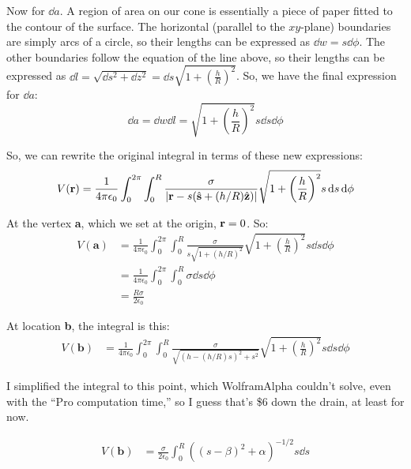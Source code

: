 \documentclass{article}
\begin{document}
Now for $\dd{a}$. A region of area on our cone is essentially a piece of paper fitted to the contour of the surface. The horizontal (parallel to the $xy$-plane) boundaries are simply arcs of a circle, so their lengths can be expressed as $\dd w = s\dd{\phi}$. The other boundaries follow the equation of the line above, so their lengths can be expressed as $\dd l = \sqrt{\dd{s}^2 + \dd{z}^2} = \dd{s}\sqrt{1 + \left(\frac{h}{R}\right)^2}$. So, we have the final expression for $\dd{a}$:
\begin{equation}
\dd{a} = \dd w \dd l = \sqrt{1 + \left(\frac{h}{R}\right)^2}s\dd{s}\dd{\phi}
\end{equation}

So, we can rewrite the original integral in terms of these new expressions:
\begin{equation}
V(\vb{r}) = \frac{1}{4\pi\epsilon_0}\int_0^{2\pi}\int_0^R \frac{\sigma}{|\vb{r} - s(\hat{\vb{s}} + (h/R)\hat{\vb{z}})|}\sqrt{1 + \left(\frac{h}{R}\right)^2}s\dd{s}\dd{\phi}
\end{equation}

At the vertex \textbf{a}, which we set at the origin, $\vb{r} = 0$. So:
\begin{equation}
\begin{aligned}
V(\textbf{a}) &= \frac{1}{4\pi\epsilon_0}\int_0^{2\pi}\int_0^R \frac{\sigma}{s\sqrt{1 + (h/R)^2}}\sqrt{1 + \left(\frac{h}{R}\right)^2}s\dd{s}\dd{\phi} \\
&= \frac{1}{4\pi\epsilon_0}\int_0^{2\pi}\int_0^R\sigma\dd{s}\dd{\phi} \\
&= \frac{R\sigma}{2\epsilon_0}
\end{aligned}
\end{equation}

At location \textbf{b}, the integral is this:
\begin{equation}
\begin{aligned}
V(\textbf{b}) &= \frac{1}{4\pi\epsilon_0}\int_0^{2\pi}\int_0^R \frac{\sigma}{\sqrt{(h -(h/R)s)^2 + s^2}}\sqrt{1 + \left(\frac{h}{R}\right)^2}s\dd{s}\dd{\phi}
\end{aligned}
\end{equation}

I simplified the integral to this point, which WolframAlpha couldn't solve, even with the ``Pro computation time,'' so I guess that's \$6 down the drain, at least for now.

\begin{equation}
\begin{aligned}
V(\textbf{b}) &= \frac{\sigma}{2\epsilon_0}\int_0^R((s-\beta)^2+\alpha)^{-1/2}s\dd{s}
\end{aligned}
\end{equation}
\end{document}
